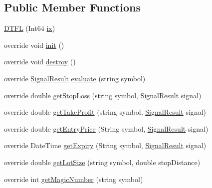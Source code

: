 \subsection*{Public Member Functions}
\begin{DoxyCompactItemize}
\item 
\hyperlink{class_d_t_f_l_1_1strategy_1_1_d_t_f_l_abe1c34e0e10243b4097b208fd44a8b0d}{D\+T\+FL} (Int64 \hyperlink{class_m_q_l4_c_sharp_1_1_base_1_1_m_q_l_1_1_m_q_l_expert_a98b5a835bb18c023f5160275efa74619}{ix})
\item 
override void \hyperlink{class_d_t_f_l_1_1strategy_1_1_d_t_f_l_a7258957027770d4bdf7d85cfa53671f3}{init} ()
\item 
override void \hyperlink{class_d_t_f_l_1_1strategy_1_1_d_t_f_l_ac402224e2e4a8a122f08a6644750098d}{destroy} ()
\item 
override \hyperlink{class_m_q_l4_c_sharp_1_1_base_1_1_common_1_1_signal_result}{Signal\+Result} \hyperlink{class_d_t_f_l_1_1strategy_1_1_d_t_f_l_a8d7d9fe1fef27d85e15489d4922a5489}{evaluate} (string symbol)
\item 
override double \hyperlink{class_d_t_f_l_1_1strategy_1_1_d_t_f_l_abf8f6ecbdfde5ccca698393035a0c21c}{get\+Stop\+Loss} (string symbol, \hyperlink{class_m_q_l4_c_sharp_1_1_base_1_1_common_1_1_signal_result}{Signal\+Result} signal)
\item 
override double \hyperlink{class_d_t_f_l_1_1strategy_1_1_d_t_f_l_a12f9ba4848a1d18100e828e479f9c6a0}{get\+Take\+Profit} (string symbol, \hyperlink{class_m_q_l4_c_sharp_1_1_base_1_1_common_1_1_signal_result}{Signal\+Result} signal)
\item 
override double \hyperlink{class_d_t_f_l_1_1strategy_1_1_d_t_f_l_a2901d5c6dc10d49f56665dd10d468b97}{get\+Entry\+Price} (String symbol, \hyperlink{class_m_q_l4_c_sharp_1_1_base_1_1_common_1_1_signal_result}{Signal\+Result} signal)
\item 
override Date\+Time \hyperlink{class_d_t_f_l_1_1strategy_1_1_d_t_f_l_a51700b70e2e57eb60c3335c5535f30f8}{get\+Expiry} (String symbol, \hyperlink{class_m_q_l4_c_sharp_1_1_base_1_1_common_1_1_signal_result}{Signal\+Result} signal)
\item 
override double \hyperlink{class_d_t_f_l_1_1strategy_1_1_d_t_f_l_a8a79776b5b7506a3ee9d78ca1fc8d6ed}{get\+Lot\+Size} (string symbol, double stop\+Distance)
\item 
override int \hyperlink{class_d_t_f_l_1_1strategy_1_1_d_t_f_l_ac03e64016fc0609582084033206acf8e}{get\+Magic\+Number} (string symbol)
\item 

\end{DoxyCompactItemize}
